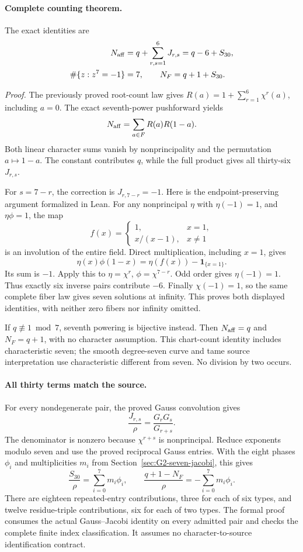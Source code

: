 \documentclass[11pt]{article}
\begin{document}
\paragraph{Complete counting theorem.}
The exact identities are
\begin{align}
 N_{\rm aff}&=q+\sum_{r,s=1}^6J_{r,s}
             =q-6+S_{30}, \label{eq:fermat-affine}\\
 \#\{z:z^7=-1\}&=7,\qquad N_F=q+1+S_{30}.
 \label{eq:fermat-complete}
\end{align}

\emph{Proof.} The previously proved root-count law gives
$R(a)=1+\sum_{r=1}^6\chi^r(a)$, including $a=0$.
The exact seventh-power pushforward yields
\[
 N_{\rm aff}=\sum_{a\in F}R(a)R(1-a).
\]
Both linear character sums vanish by nonprincipality and the
permutation $a\mapsto1-a$. The constant contributes $q$, while
the full product gives all thirty-six $J_{r,s}$.

For $s=7-r$, the correction is $J_{r,7-r}=-1$.
Here is the endpoint-preserving argument formalized in Lean.
For any nonprincipal $\eta$ with $\eta(-1)=1$, and
$\eta\phi=1$, the map
\[
 f(x)=
 \begin{cases}1,&x=1,\\ x/(x-1),&x\ne1\end{cases}
\]
is an involution of the entire field. Direct multiplication,
including $x=1$, gives
\[
 \eta(x)\phi(1-x)=\eta(f(x))-\boldsymbol1_{\{x=1\}}.
\]
Its sum is $-1$. Apply this to $\eta=\chi^r$,
$\phi=\chi^{7-r}$. Odd order gives $\eta(-1)=1$.
Thus exactly six inverse pairs contribute $-6$.
Finally $\chi(-1)=1$, so the same complete fiber law gives seven
solutions at infinity. This proves both displayed identities,
with neither zero fibers nor infinity omitted.

If $q\not\equiv1\bmod7$, seventh powering is bijective instead.
Then $N_{\rm aff}=q$ and $N_F=q+1$, with no character assumption.
This chart-count identity includes characteristic seven; the
smooth degree-seven curve and tame source interpretation use
characteristic different from seven. No division by two occurs.

\paragraph{All thirty terms match the source.}
For every nondegenerate pair, the proved Gauss convolution gives
\[
 \frac{J_{r,s}}{\rho}=\frac{G_rG_s}{G_{r+s}}.
\]
The denominator is nonzero because $\chi^{r+s}$ is nonprincipal.
Reduce exponents modulo seven and use the proved reciprocal
Gauss entries. With the eight phases $\phi_i$ and multiplicities
$m_i$ from Section~\ref{sec:G2-seven-jacobi}, this gives
\begin{equation}
 \frac{S_{30}}{\rho}=\sum_{i=0}^7m_i\phi_i,\qquad
 \frac{q+1-N_F}{\rho}=-\sum_{i=0}^7m_i\phi_i .
 \label{eq:fermat-phase-total}
\end{equation}
There are eighteen repeated-entry contributions, three for each
of six types, and twelve residue-triple contributions, six for
each of two types. The formal proof consumes the actual
Gauss--Jacobi identity on every admitted pair and checks the
complete finite index classification. It assumes no
character-to-source identification contract.
\end{document}
